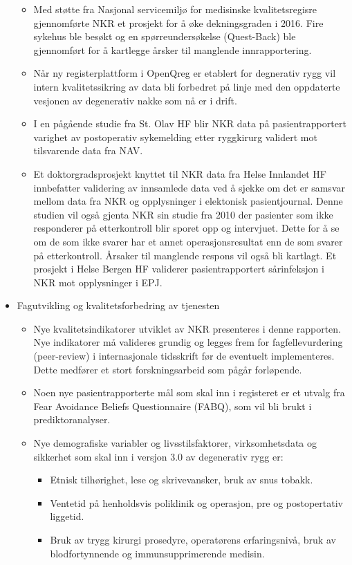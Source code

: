 \documentclass[norsk, a4paper, twocolumn]{report}
\begin{document}
\begin{itemize}
\begin{itemize}
      \item Med støtte fra Nasjonal servicemiljø for medisinske kvalitetsregisre gjennomførte NKR et prosjekt for å øke dekningsgraden i 2016. Fire sykehus ble besøkt og en spørreundersøkelse (Quest-Back) ble gjennomført for å kartlegge årsker til manglende innrapportering.
      \item Når ny registerplattform i OpenQreg er etablert for degnerativ rygg vil intern kvalitetssikring av data bli forbedret på linje med den oppdaterte vesjonen av degenerativ nakke som nå er i drift.
      \item I en pågående studie fra St. Olav HF blir NKR data på pasientrapportert varighet av postoperativ sykemelding etter ryggkirurg  validert mot tilsvarende data fra NAV.
      \item Et doktorgradsprosjekt knyttet til NKR data fra Helse Innlandet HF innbefatter validering av innsamlede data ved å sjekke om det er samsvar mellom data fra NKR og opplysninger i elektonisk pasientjournal. Denne studien vil også gjenta NKR sin studie fra 2010 der pasienter som ikke responderer på etterkontroll blir sporet opp og intervjuet. Dette for å se om de som ikke svarer har et annet operasjonsresultat enn de som svarer på etterkontroll. Årsaker til manglende respons vil også bli kartlagt. Et prosjekt i Helse Bergen HF validerer pasientrapportert sårinfeksjon i NKR mot opplysninger i EPJ.
      
    \end{itemize}
  \item Fagutvikling og kvalitetsforbedring av tjenesten
    \begin{itemize}
      \item Nye kvalitetsindikatorer utviklet av NKR presenteres i denne rapporten. Nye indikatorer må valideres grundig og legges frem for fagfellevurdering  (peer-review) i internasjonale tidsskrift før de eventuelt implementeres. Dette medfører et stort forskningsarbeid som pågår forløpende.  
      \item Noen nye pasientrapporterte mål som skal inn i registeret er et utvalg fra Fear Avoidance Beliefs Questionnaire (FABQ), som vil bli brukt   i prediktoranalyser.
      \item Nye demografiske variabler og livsstilsfaktorer, virksomhetsdata og sikkerhet som skal inn i versjon 3.0 av degenerativ rygg er: \begin{itemize} \item Etnisk tilhørighet, lese og skrivevansker,  bruk av snus tobakk. \item Ventetid på henholdsvis poliklinik og operasjon, pre og postopertativ liggetid. \item Bruk av trygg kirurgi prosedyre, operatørens erfaringsnivå, bruk av blodfortynnende og immunsupprimerende medisin. \end{itemize}
    

\end{itemize}
\end{itemize}
\end{document}
